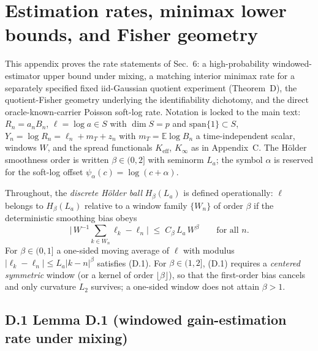 \section{Estimation rates, minimax lower bounds, and Fisher geometry}

This appendix proves the rate statements of Sec.~6: a high-probability windowed-estimator upper bound under mixing, a matching interior minimax rate for a separately specified fixed iid-Gaussian quotient experiment (Theorem~D), the quotient-Fisher geometry underlying the identifiability dichotomy, and the direct oracle-known-carrier Poisson soft-log rate. Notation is locked to the main text: $R_n=a_nB_n$, $\ell=\log a\in S$ with $\dim S=p$ and $\mathrm{span}\{1\}\subset S$, $Y_n=\log R_n=\ell_n+m_T+z_n$ with $m_T=\mathbb{E}\log B_n$ a time-independent scalar, windows $W$, and the spread functionals $K_{\mathrm{eff}}$, $K_\infty$ as in Appendix~C. The H\"older smoothness order is written $\beta\in(0,2]$ with seminorm $L_a$; the symbol $\alpha$ is reserved for the soft-log offset $\psi_\alpha(c)=\log(c+\alpha)$.

Throughout, the \emph{discrete H\"older ball} $H_\beta(L_a)$ is defined operationally: $\ell$ belongs to $H_\beta(L_a)$ relative to a window family $\{W_n\}$ of order $\beta$ if the deterministic smoothing bias obeys
\begin{equation}
\Big|\,W^{-1}\!\!\sum_{k\in W_n}\ell_k-\ell_n\Big|\;\le\;C_\beta\,L_a\,W^{\beta}\qquad\text{for all }n. \tag{D.1}
\end{equation}
For $\beta\in(0,1]$ a one-sided moving average of $\ell$ with modulus $|\ell_k-\ell_n|\le L_a|k-n|^{\beta}$ satisfies (D.1). For $\beta\in(1,2]$, (D.1) requires a \emph{centered symmetric} window (or a kernel of order $\lfloor\beta\rfloor$), so that the first-order bias cancels and only curvature $L_2$ survives; a one-sided window does not attain $\beta>1$.

\subsection{D.1 Lemma D.1 (windowed gain-estimation rate under mixing)}

